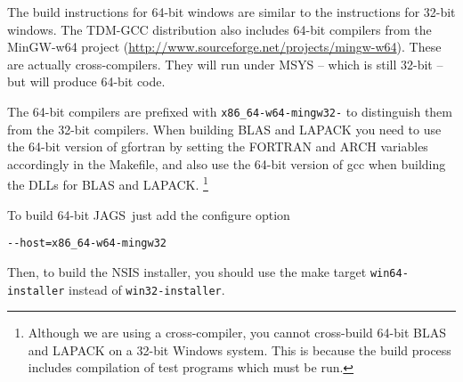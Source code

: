 \documentclass[11pt, a4paper, titlepage]{article}
\newcommand{\JAGS}{\textsf{JAGS}}
\begin{document}
The build instructions for 64-bit windows are similar
to the instructions for 32-bit windows.  The TDM-GCC distribution also
includes 64-bit compilers from the MinGW-w64 project
(\url{http://www.sourceforge.net/projects/mingw-w64}).  These are actually
cross-compilers. They will run under MSYS -- which is still 32-bit --
but will produce 64-bit code.

The 64-bit compilers are prefixed with \verb+x86_64-w64-mingw32-+ to
distinguish them from the 32-bit compilers. When building BLAS and LAPACK
you need to use the 64-bit version of gfortran by setting the FORTRAN
and ARCH variables accordingly in the Makefile, and also use
the 64-bit version of gcc when building the DLLs for BLAS and
LAPACK. \footnote{Although we are using a cross-compiler, you cannot
cross-build 64-bit BLAS and LAPACK on a 32-bit Windows system. This is
because the build process includes compilation of test programs which
must be run.}

To build 64-bit \JAGS\, just add the configure option
\begin{verbatim}
--host=x86_64-w64-mingw32
\end{verbatim}

Then, to build the NSIS installer, you should use the make
target \verb+win64-installer+ instead of \verb+win32-installer+.
\end{document}
